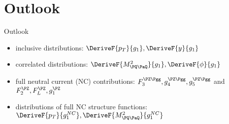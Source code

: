 \section{Outlook}
\begin{frame}{Outlook}
\begin{itemize}
\item inclusive distributions: $\DeriveF{p_T}{g_1},\DeriveF{y}{g_1}$
\item correlated distributions: $\DeriveF{{M_{\PQ\PaQ}^2}}{g_1}, \DeriveF{\phi}{g_1}$
\item full neutral current (NC) contributions: $F_3^{\PZ\Pgg}, g_4^{\PZ\Pgg}, g_5^{\PZ\Pgg}$ and $F_2^{\PZ}, F_L^{\PZ}, g_1^{\PZ}$
\item distributions of full NC structure functions: $\DeriveF{p_T}{g_1^{NC}},\DeriveF{{M_{\PQ\PaQ}^2}}{g_1^{NC}}$
\end{itemize}
\end{frame}
